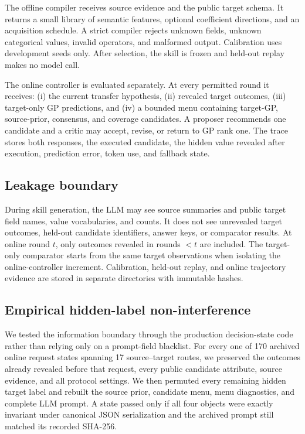 \documentclass[pdflatex,sn-nature]{sn-jnl}
\begin{document}
\begin{appendices}
The offline compiler receives source evidence and the public target schema. It
returns a small library of semantic features, optional coefficient directions,
and an acquisition schedule. A strict compiler rejects unknown fields, unknown
categorical values, invalid operators, and malformed output. Calibration uses
development seeds only. After selection, the skill is frozen and held-out
replay makes no model call.

The online controller is evaluated separately. At every permitted round it
receives: (i) the current transfer hypothesis, (ii) revealed target outcomes,
(iii) target-only GP predictions, and (iv) a bounded menu containing target-GP,
source-prior, consensus, and coverage candidates. A proposer recommends one
candidate and a critic may accept, revise, or return to GP rank one. The trace
stores both responses, the executed candidate, the hidden value revealed after
execution, prediction error, token use, and fallback state.

\subsection{Leakage boundary}

During skill generation, the LLM may see source summaries and public target
field names, value vocabularies, and counts. It does not see unrevealed target
outcomes, held-out candidate identifiers, answer keys, or comparator results.
At online round $t$, only outcomes revealed in rounds $<t$ are included. The
target-only comparator starts from the same target observations when isolating
the online-controller increment. Calibration, held-out replay, and online
trajectory evidence are stored in separate directories with immutable hashes.

\subsection{Empirical hidden-label non-interference}
\label{sec:noninterference}

We tested the information boundary through the production decision-state code
rather than relying only on a prompt-field blacklist. For every one of 170
archived online request states spanning 17 source--target routes, we preserved
the outcomes already revealed before that request, every public candidate
attribute, source evidence, and all protocol settings. We then permuted every
remaining hidden target label and rebuilt the source prior, candidate menu,
menu diagnostics, and complete LLM prompt. A state passed only if all four
objects were exactly invariant under canonical JSON serialization and the
archived prompt still matched its recorded SHA-256.


\end{appendices}
\end{document}
